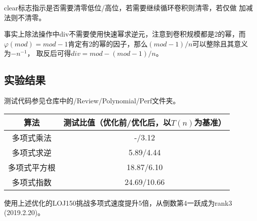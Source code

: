 clear标志指示是否需要清零低位/高位，若需要继续循环卷积则清零，若仅做
加减法则不清零。

事实上除法操作中div不需要使用快速幂求逆元，注意到卷积规模都是2的幂，而
$\varphi(mod)=mod-1$肯定有2的幂的因子，那么$(mod-1)/n$可以整除且其意义为$-n^{-1}$，
取反后可得$div=mod-(mod-1)/n$。
\subsection{实验结果}
测试代码参见仓库中的/Review/Polynomial/Perf文件夹。

\begin{tabular}{c|c}
\hline
算法 & 测试比值（优化前/优化后，以$T(n)$为基准）\\
\hline
多项式乘法 & -/3.12\\
多项式求逆&5.89/4.44\\
多项式平方根&18.87/6.10\\
多项式指数&24.69/10.66\\
\hline
\end{tabular}

使用上述优化的LOJ150挑战多项式速度提升5倍，从倒数第4一跃成为rank3\\(2019.2.20)。
